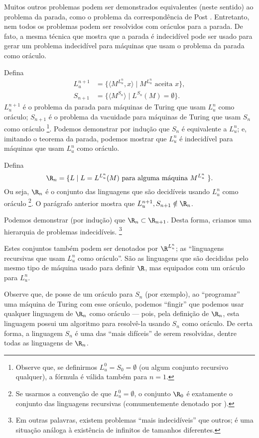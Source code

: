 Muitos outros problemas podem ser demonstrados equivalentes
(neste sentido)
ao problema da parada,
como o problema da correspondência de Post \cite[p. 214]{HopcroftUllman1979}.
Entretanto,
nem todos os problemas podem ser resolvidos com oráculos para a parada.
De fato, a mesma técnica que mostra que a parada é indecidível
pode ser usado para gerar um problema indecidível
para máquinas que usam o problema da parada como oráculo.

Defina
\begin{align*}
    L_u^{n+1} &= \{ \langle M^{L_u^n}, x \rangle \mid M^{L_u^n} \text{ aceita } x \}, \\
    S_{n+1} &= \{ \langle M^{S_n} \rangle \mid L^{S_n}(M) = \emptyset \}.
\end{align*}
$L_u^{n+1}$ é o problema da parada
para máquinas de Turing que usam $L_u^n$ como oráculo;
$S_{n+1}$ é o problema da vacuidade
para máquinas de Turing que usam $S_n$ como oráculo%
\footnote{
    Observe que,
    se definirmos $L_u^0 = S_0 = \emptyset$
    (ou algum conjunto recursivo qualquer),
    a fórmula é válida também para $n = 1$.
}.
Podemos demonstrar por indução que $S_n$ é equivalente a $L_u^n$;
e, imitando o teorema da parada,
podemos mostrar que $L_u^n$ é indecidível para máquinas que usam $L_u^n$ como oráculo.

Defina
\begin{equation*}
    \R_n = \{ L \mid L = L^{L_u^n}(M) \text{ para alguma máquina $M^{L_u^n}$ } \}.
\end{equation*}
Ou seja, $\R_n$ é o conjunto das linguagens
que são decidíveis usando $L_u^n$ como oráculo%
\footnote{
    Se usarmos a convenção de que $L_u^0 = \emptyset$,
    o conjunto $\R_0$ é exatamente o conjunto das linguagens recursivas
    (comumentemente denotado por \R).
}.
O parágrafo anterior mostra que $L_u^{n+1}, S_{n+1} \notin \R_n$.

Podemos demonstrar (por indução) que $\R_n \subset \R_{n+1}$.
Desta forma,
criamos uma hierarquia de problemas indecidíveis.
\footnote{
    Em outras palavras,
    existem problemas ``mais indecidíveis'' que outros;
    é uma situação análoga à existência de infinitos de tamanhos diferentes.
}

Estes conjuntos também podem ser denotados por $\R^{L_u^n}$;
as ``linguagens recursivas que usam $L_u^n$ como oráculo''.
São as linguagens que são decididas
pelo mesmo tipo de máquina usado para definir $\R$,
mas equipados com um oráculo para $L_u^n$.

Observe que,
de posse de um oráculo para $S_n$ (por exemplo),
ao ``programar'' uma máquina de Turing com esse oráculo,
podemos ``fingir'' que podemos usar qualquer linguagem de $\R_n$ como oráculo
--- pois, pela definição de $\R_n$,
esta linguagem possui um algoritmo para resolvê-la
usando $S_n$ como oráculo.
De certa forma,
a linguagem $S_n$ é uma das ``mais difíceis'' de serem resolvidas,
dentre todas as linguagens de $\R_n$.

